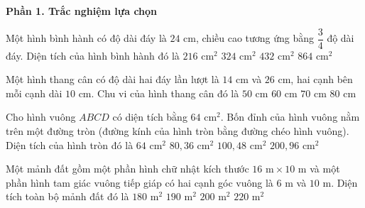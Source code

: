 \textbf{Phần 1. Trắc nghiệm lựa chọn}

\begin{ex} %
Một hình bình hành có độ dài đáy là $24\text{ cm}$, chiều cao tương ứng bằng $\dfrac{3}{4}$ độ dài đáy. Diện tích của hình bình hành đó là
\choice
{$216\text{ cm}^2$}
{$324\text{ cm}^2$}
{\True $432\text{ cm}^2$}
{$864\text{ cm}^2$}
\end{ex}

\begin{ex} %
Một hình thang cân có độ dài hai đáy lần lượt là $14\text{ cm}$ và $26\text{ cm}$, hai cạnh bên mỗi cạnh dài $10\text{ cm}$. Chu vi của hình thang cân đó là
\choice
{$50\text{ cm}$}
{\True $60\text{ cm}$}
{$70\text{ cm}$}
{$80\text{ cm}$}
\end{ex}

\begin{ex} %
Cho hình vuông $ABCD$ có diện tích bằng $64\text{ cm}^2$. Bốn đỉnh của hình vuông nằm trên một đường tròn (đường kính của hình tròn bằng đường chéo hình vuông). Diện tích của hình tròn đó là
\choice
{$64\text{ cm}^2$}
{$80{,}36\text{ cm}^2$}
{\True $100{,}48\text{ cm}^2$}
{$200{,}96\text{ cm}^2$}
\end{ex}

\begin{ex} %
Một mảnh đất gồm một phần hình chữ nhật kích thước $16\text{ m} \times 10\text{ m}$ và một phần hình tam giác vuông tiếp giáp có hai cạnh góc vuông là $6\text{ m}$ và $10\text{ m}$. Diện tích toàn bộ mảnh đất đó là
\choice
{$180\text{ m}^2$}
{\True $190\text{ m}^2$}
{$200\text{ m}^2$}
{$220\text{ m}^2$}
\end{ex}

